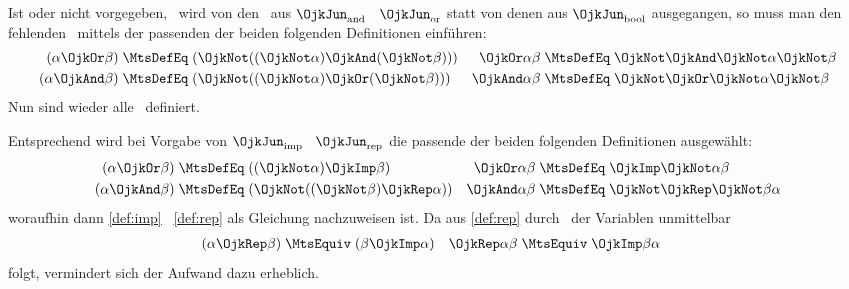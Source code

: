 Ist \chrqt{\OjkOr} oder \chrqt{\OjkAnd} nicht vorgegeben, \textdh\ wird von den \Elementen\ aus $\OjkJun_{\RawMtsIdxAnd}$ \textbzgl\ $\OjkJun_{\RawMtsIdxOr}$ statt von denen aus $\OjkJun_\RawMtsIdxBool$ ausgegangen, so muss man den fehlenden \Junktor\ mittels der passenden der beiden folgenden Definitionen einführen:
\begin{align}
(\alpha \OjkOr \beta)  & \;\MtsDefEq\; (\OjkNot((\OjkNot\alpha)\OjkAnd(\OjkNot\beta))) &
\OjkOr \alpha  \beta   & \;\MtsDefEq\;  \OjkNot \OjkAnd \OjkNot \alpha \OjkNot \beta
\label{def:orand} \\
(\alpha \OjkAnd \beta) & \;\MtsDefEq\; (\OjkNot((\OjkNot\alpha)\OjkOr(\OjkNot\beta)))  &
\OjkAnd \alpha  \beta  & \;\MtsDefEq\;  \OjkNot \OjkOr \OjkNot \alpha \OjkNot \beta
\label{def:andor}
\end{align}
Nun sind wieder alle \Junktoren\ definiert.

Entsprechend wird bei Vorgabe von $\OjkJun_{\RawMtsIdxImp}$ \textbzgl\ $\OjkJun_{\RawMtsIdxRep}$ die passende der beiden folgenden Definitionen ausgewählt:
\begin{align}
(\alpha \OjkOr  \beta) & \;\MtsDefEq\; ((\OjkNot \alpha) \OjkImp \beta)         &
\OjkOr \alpha   \beta  & \;\MtsDefEq\;   \OjkImp \OjkNot \alpha \beta
\label{def:orrep}
\\
(\alpha \OjkAnd \beta) & \;\MtsDefEq\; (\OjkNot ((\OjkNot \beta) \OjkRep \alpha)) &
\OjkAnd \alpha  \beta  & \;\MtsDefEq\;  \OjkNot \OjkRep \OjkNot \beta \alpha
\label{def:andrep}
\end{align}
woraufhin dann \eqref{def:imp} \textbzgl\ \eqref{def:rep} als Gleichung nachzuweisen ist.
Da aus \eqref{def:rep} durch \Vertauschung\ der Variablen unmittelbar
\begin{align}
(\alpha \OjkRep \beta) & \;\MtsEquiv\; (\beta \OjkImp \alpha) &
\OjkRep \alpha  \beta  & \;\MtsEquiv\;  \OjkImp \beta \alpha  \label{eq:repimp}
\end{align}
folgt, vermindert sich der Aufwand dazu erheblich.

